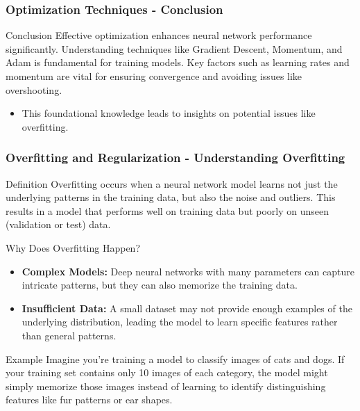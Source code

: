 \documentclass[aspectratio=169]{beamer}
\begin{document}
\begin{frame}[fragile]
    \frametitle{Optimization Techniques - Conclusion}
    \begin{block}{Conclusion}
        Effective optimization enhances neural network performance significantly. Understanding techniques like Gradient Descent, Momentum, and Adam is fundamental for training models. Key factors such as learning rates and momentum are vital for ensuring convergence and avoiding issues like overshooting.
    \end{block}
    \begin{itemize}
        \item This foundational knowledge leads to insights on potential issues like overfitting.
    \end{itemize}
\end{frame}

\begin{frame}[fragile]
    \frametitle{Overfitting and Regularization - Understanding Overfitting}
    \begin{block}{Definition}
        Overfitting occurs when a neural network model learns not just the underlying patterns in the training data, but also the noise and outliers. This results in a model that performs well on training data but poorly on unseen (validation or test) data.
    \end{block}
    
    \begin{block}{Why Does Overfitting Happen?}
        \begin{itemize}
            \item \textbf{Complex Models:} Deep neural networks with many parameters can capture intricate patterns, but they can also memorize the training data.
            \item \textbf{Insufficient Data:} A small dataset may not provide enough examples of the underlying distribution, leading the model to learn specific features rather than general patterns.
        \end{itemize}
    \end{block}
    
    \begin{block}{Example}
        Imagine you're training a model to classify images of cats and dogs. If your training set contains only 10 images of each category, the model might simply memorize those images instead of learning to identify distinguishing features like fur patterns or ear shapes.
    \end{block}
\end{frame}
\end{document}

